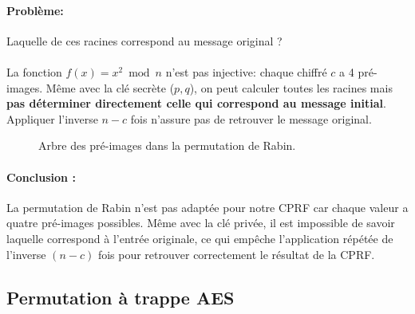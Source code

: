 \documentclass[9pt]{extarticle}
\begin{document}
\paragraph{Problème:}Laquelle de ces racines correspond au message original ?
\paragraph{}
La fonction \(f(x) = x^2 \bmod n\) n'est pas injective: chaque chiffré \(c\) a 4 pré-images.
Même avec la clé secrète (\(p,q\)), on peut calculer toutes les racines mais \textbf{pas déterminer directement celle qui correspond au message initial}.
Appliquer l'inverse \(n-c\) fois n'assure pas de retrouver le message original.



\begin{figure}[H]
  \centering
{}
\caption{Arbre des pré-images dans la permutation de Rabin.}\label{fig:rabin-tree}
\end{figure}

\paragraph{Conclusion :}
La permutation de Rabin n'est pas adaptée pour notre CPRF car chaque valeur a quatre pré-images possibles. 
Même avec la clé privée, il est impossible de savoir laquelle correspond à l'entrée originale, ce qui empêche 
l'application répétée de l'inverse $(n-c)$ fois pour retrouver correctement le résultat de la CPRF.


\subsection{Permutation à trappe AES}
\end{document}
